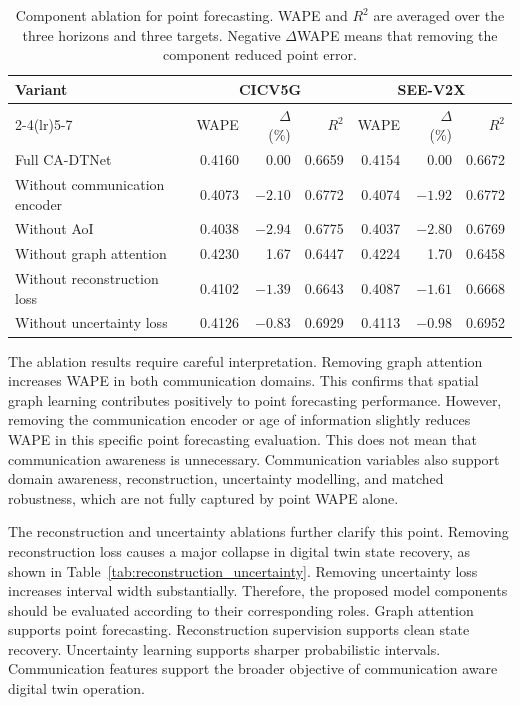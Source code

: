 \documentclass[pdflatex,sn-mathphys-num]{sn-jnl}%
\theoremstyle{thmstyleone}%
\theoremstyle{thmstyletwo}%
\theoremstyle{thmstylethree}%
\begin{document}
\begin{table}[!htbp]
\caption{Component ablation for point forecasting. WAPE and $R^{2}$ are averaged over the three horizons and three targets. Negative $\Delta$WAPE means that removing the component reduced point error.}
\label{tab:ablation_point_forecasting}
\centering
\footnotesize
\renewcommand{\arraystretch}{1.15}
\setlength{\tabcolsep}{2.5pt}
\begin{tabular}{lrrrrrr}
\toprule
\multirow{2}{*}{Variant} & \multicolumn{3}{c}{CICV5G} & \multicolumn{3}{c}{SEE-V2X} \\
\cmidrule(lr){2-4}\cmidrule(lr){5-7}
& WAPE & $\Delta$ (\%) & $R^2$ & WAPE & $\Delta$ (\%) & $R^2$ \\
\midrule
Full CA-DTNet & 0.4160 & 0.00 & 0.6659 & 0.4154 & 0.00 & 0.6672 \\
Without communication encoder & 0.4073 & $-2.10$ & 0.6772 & 0.4074 & $-1.92$ & 0.6772 \\
Without AoI & 0.4038 & $-2.94$ & 0.6775 & 0.4037 & $-2.80$ & 0.6769 \\
Without graph attention & 0.4230 & 1.67 & 0.6447 & 0.4224 & 1.70 & 0.6458 \\
Without reconstruction loss & 0.4102 & $-1.39$ & 0.6643 & 0.4087 & $-1.61$ & 0.6668 \\
Without uncertainty loss & 0.4126 & $-0.83$ & 0.6929 & 0.4113 & $-0.98$ & 0.6952 \\
\bottomrule
\end{tabular}
\end{table}

The ablation results require careful interpretation. Removing graph attention increases WAPE in both communication domains. This confirms that spatial graph learning contributes positively to point forecasting performance. However, removing the communication encoder or age of information slightly reduces WAPE in this specific point forecasting evaluation. This does not mean that communication awareness is unnecessary. Communication variables also support domain awareness, reconstruction, uncertainty modelling, and matched robustness, which are not fully captured by point WAPE alone.

The reconstruction and uncertainty ablations further clarify this point. Removing reconstruction loss causes a major collapse in digital twin state recovery, as shown in Table~\ref{tab:reconstruction_uncertainty}. Removing uncertainty loss increases interval width substantially. Therefore, the proposed model components should be evaluated according to their corresponding roles. Graph attention supports point forecasting. Reconstruction supervision supports clean state recovery. Uncertainty learning supports sharper probabilistic intervals. Communication features support the broader objective of communication aware digital twin operation.
\end{document}
